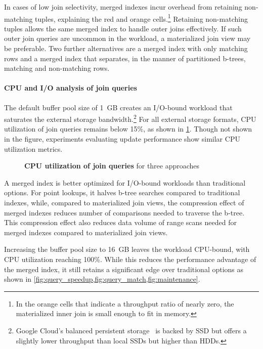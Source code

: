 \documentclass[biblatex, english]{lni}
\begin{document}
In cases of low join selectivity, merged indexes incur overhead from retaining non-matching tuples, explaining the red and orange cells.\footnote{
    In the orange cells that indicate a throughput ratio of nearly zero, the materialized inner join is small enough to fit in memory.
}
Retaining non-matching tuples allows the same merged index to handle outer joins effectively.
If such outer join queries are uncommon in the workload, a materialized join view may be preferable.
Two further alternatives are a merged index with only matching rows and a merged index that separates, in the manner of partitioned b-trees, matching and non-matching rows.

\paragraph{CPU and I/O analysis of join queries}

The default buffer pool size of 1~GB creates an I/O-bound workload that saturates the external storage bandwidth.\footnote{
  Google Cloud's balanced persistent storage~\cite{gclouddisk} is backed by SSD but offers a slightly lower throughput than local SSDs but higher than HDDs.
}
For all external storage formats, CPU utilization of join queries remains below 15\%, as shown in \cref{fig:cpu_utilization}.
Though not shown in the figure, experiments evaluating update performance show similar CPU utilization metrics.

\begin{figure}[!htb]
    \centering
    \caption{\textbf{CPU utilization of join queries} for three approaches}\label{fig:cpu_utilization}
\end{figure}

A merged index is better optimized for I/O-bound workloads than traditional options.
For point lookups, it halves b-tree searches compared to traditional indexes, while, compared to materialized join views, the compression effect of merged indexes reduces number of comparisons needed to traverse the b-tree.
This compression effect also reduces data volume of range scans needed for merged indexes compared to materialized join views.

Increasing the buffer pool size to 16~GB leaves the workload CPU-bound, with CPU utilization reaching 100\%.
While this reduces the performance advantage of the merged index, it still retains a significant edge over traditional options as shown in \cref{fig:query_speedup,fig:query_match,fig:maintenance}.
\end{document}
